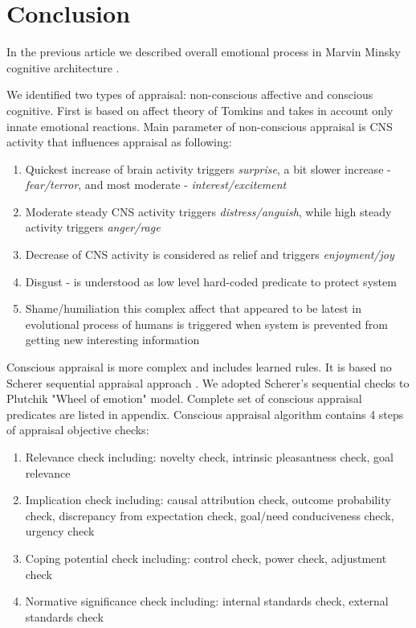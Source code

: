 \section{Conclusion}

In the previous article \cite{computational_emotional_thinking} we described overall emotional process in Marvin Minsky cognitive architecture \cite{emotionmachine}. 

We identified two types of appraisal: non-conscious affective and conscious cognitive. First is based on affect theory of Tomkins \cite{primer_affect_psychology} and takes in account only innate emotional reactions. Main parameter of non-conscious appraisal is CNS activity that influences appraisal as following:

\begin{enumerate}
 \item  Quickest increase of brain activity triggers \emph{surprise}, a bit slower increase - \emph{fear/terror}, and most moderate - \emph{interest/excitement}
 \item  Moderate steady CNS activity triggers \emph{distress/anguish}, while high steady activity triggers \emph{anger/rage}
 \item  Decrease of CNS activity is considered as relief and triggers \emph{enjoyment/joy}
 \item  Disgust - is understood as low level hard-coded predicate to protect system
 \item  Shame/humiliation this complex affect that appeared to be latest in evolutional process of humans is triggered when system is prevented from getting new interesting information
\end{enumerate}

Conscious appraisal is more complex and includes learned rules. It is based no Scherer sequential appraisal approach \cite{appraisal_considered_as_a_process}. We adopted Scherer's sequential checks to Plutchik "Wheel of emotion" \cite{natureofemotions} model. Complete set of conscious appraisal predicates are listed in appendix. Conscious appraisal algorithm contains 4 steps of appraisal objective checks:

\begin{enumerate}
 \item  Relevance check including: novelty check, intrinsic pleasantness check, goal relevance
 \item  Implication check including: causal attribution check, outcome probability check, discrepancy from expectation check, goal/need conduciveness check, urgency check
 \item  Coping potential check including: control check, power check, adjustment check
 \item  Normative significance check including: internal standards check, external standards check
\end{enumerate}

